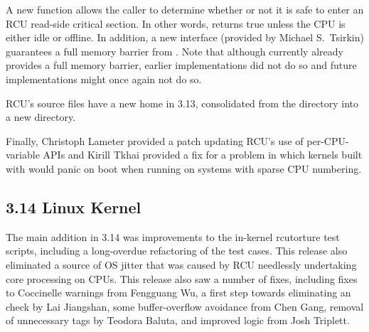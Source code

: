 A new  function allows the caller to determine
whether or not it is safe to enter an RCU read-side critical section.
In other words,  returns true unless the CPU is
either idle or offline.
In addition, a new 
interface (provided by Michael S.~Tsirkin)
guarantees a full memory barrier from .
Note that although  currently already provides
a full memory barrier, earlier implementations did not do so and
future implementations might once again not do so.

RCU's source files have a new home in 3.13, consolidated from the
 directory into a new  directory.

Finally, Christoph Lameter provided a patch updating RCU's use of
per-CPU-variable APIs and Kirill Tkhai provided a fix for a problem
in which kernels built with  would
panic on boot when running
on systems with sparse CPU numbering.

\subsection{3.14 Linux Kernel}

The main addition in 3.14 was improvements to the in-kernel rcutorture
test scripts, including a long-overdue refactoring of the test cases.
This release also eliminated a source of OS jitter that was caused
by RCU needlessly undertaking core processing on  CPUs.
This release also saw a number of fixes, including fixes to Coccinelle
warnings from Fengguang Wu, a first step towards eliminating an
 check by Lai Jiangshan, some buffer-overflow
avoidance from Chen Gang, removal of unnecessary  tags by
Teodora Baluta, and improved  logic from
Josh Triplett.
